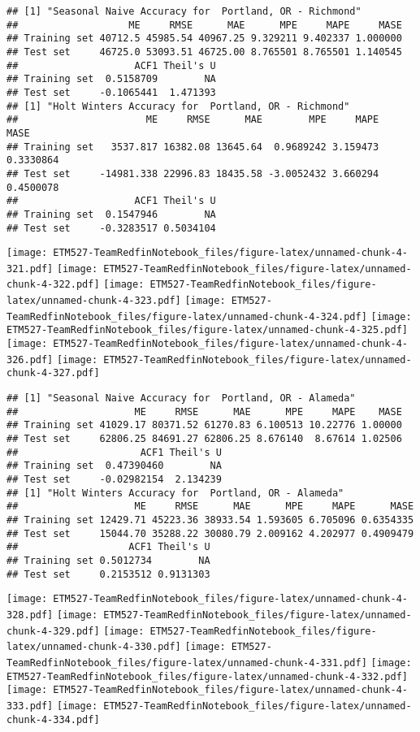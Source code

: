 \documentclass[]{article}
\begin{document}
\begin{verbatim}
## [1] "Seasonal Naive Accuracy for  Portland, OR - Richmond"
##                   ME     RMSE      MAE      MPE     MAPE     MASE
## Training set 40712.5 45985.54 40967.25 9.329211 9.402337 1.000000
## Test set     46725.0 53093.51 46725.00 8.765501 8.765501 1.140545
##                    ACF1 Theil's U
## Training set  0.5158709        NA
## Test set     -0.1065441  1.471393
## [1] "Holt Winters Accuracy for  Portland, OR - Richmond"
##                      ME     RMSE      MAE        MPE     MAPE      MASE
## Training set   3537.817 16382.08 13645.64  0.9689242 3.159473 0.3330864
## Test set     -14981.338 22996.83 18435.58 -3.0052432 3.660294 0.4500078
##                    ACF1 Theil's U
## Training set  0.1547946        NA
## Test set     -0.3283517 0.5034104
\end{verbatim}

\texttt{[image: ETM527-TeamRedfinNotebook\_files/figure-latex/unnamed-chunk-4-321.pdf]}
\texttt{[image: ETM527-TeamRedfinNotebook\_files/figure-latex/unnamed-chunk-4-322.pdf]}
\texttt{[image: ETM527-TeamRedfinNotebook\_files/figure-latex/unnamed-chunk-4-323.pdf]}
\texttt{[image: ETM527-TeamRedfinNotebook\_files/figure-latex/unnamed-chunk-4-324.pdf]}
\texttt{[image: ETM527-TeamRedfinNotebook\_files/figure-latex/unnamed-chunk-4-325.pdf]}
\texttt{[image: ETM527-TeamRedfinNotebook\_files/figure-latex/unnamed-chunk-4-326.pdf]}
\texttt{[image: ETM527-TeamRedfinNotebook\_files/figure-latex/unnamed-chunk-4-327.pdf]}

\begin{verbatim}
## [1] "Seasonal Naive Accuracy for  Portland, OR - Alameda"
##                    ME     RMSE      MAE      MPE     MAPE    MASE
## Training set 41029.17 80371.52 61270.83 6.100513 10.22776 1.00000
## Test set     62806.25 84691.27 62806.25 8.676140  8.67614 1.02506
##                     ACF1 Theil's U
## Training set  0.47390460        NA
## Test set     -0.02982154  2.134239
## [1] "Holt Winters Accuracy for  Portland, OR - Alameda"
##                    ME     RMSE      MAE      MPE     MAPE      MASE
## Training set 12429.71 45223.36 38933.54 1.593605 6.705096 0.6354335
## Test set     15044.70 35288.22 30080.79 2.009162 4.202977 0.4909479
##                   ACF1 Theil's U
## Training set 0.5012734        NA
## Test set     0.2153512 0.9131303
\end{verbatim}

\texttt{[image: ETM527-TeamRedfinNotebook\_files/figure-latex/unnamed-chunk-4-328.pdf]}
\texttt{[image: ETM527-TeamRedfinNotebook\_files/figure-latex/unnamed-chunk-4-329.pdf]}
\texttt{[image: ETM527-TeamRedfinNotebook\_files/figure-latex/unnamed-chunk-4-330.pdf]}
\texttt{[image: ETM527-TeamRedfinNotebook\_files/figure-latex/unnamed-chunk-4-331.pdf]}
\texttt{[image: ETM527-TeamRedfinNotebook\_files/figure-latex/unnamed-chunk-4-332.pdf]}
\texttt{[image: ETM527-TeamRedfinNotebook\_files/figure-latex/unnamed-chunk-4-333.pdf]}
\texttt{[image: ETM527-TeamRedfinNotebook\_files/figure-latex/unnamed-chunk-4-334.pdf]}
\end{document}
